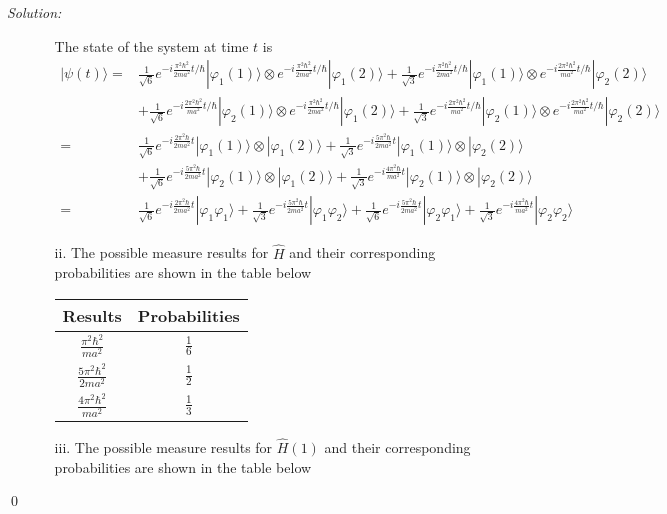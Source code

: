 \documentclass[12pt,a4paper]{article}
\newenvironment{sol}
    {\emph{Solution:}
    }
    {
    \qed
    }
\begin{document}
\begin{sol}
\begin{itemize}
\begin{itemize}
The state of the system at time $t$ is
\small\begin{align}
\nonumber|\psi(t)\rangle=&\frac{1}{\sqrt{6}}e^{-i\frac{\pi^2\hbar^2}{2ma^2}t/\hbar}|\varphi_1(1)\rangle\otimes e^{-i\frac{\pi^2\hbar^2}{2ma^2}t/\hbar}|\varphi_1(2)\rangle+\frac{1}{\sqrt{3}}e^{-i\frac{\pi^2\hbar^2}{2ma^2}t/\hbar}|\varphi_1(1)\rangle\otimes e^{-i\frac{2\pi^2\hbar^2}{ma^2}t/\hbar}|\varphi_2(2)\rangle\\
\nonumber&+\frac{1}{\sqrt{6}}e^{-i\frac{2\pi^2\hbar^2}{ma^2}t/\hbar}|\varphi_2(1)\rangle\otimes e^{-i\frac{\pi^2\hbar^2}{2ma^2}t/\hbar}|\varphi_1(2)\rangle+\frac{1}{\sqrt{3}}e^{-i\frac{2\pi^2\hbar^2}{ma^2}t/\hbar}|\varphi_2(1)\rangle\otimes e^{-i\frac{2\pi^2\hbar^2}{ma^2}t/\hbar}|\varphi_2(2)\rangle\\
\nonumber=&\frac{1}{\sqrt{6}}e^{-i\frac{2\pi^2\hbar}{2ma^2}t}|\varphi_1(1)\rangle\otimes|\varphi_1(2)\rangle+\frac{1}{\sqrt{3}}e^{-i\frac{5\pi^2\hbar}{2ma^2}t}|\varphi_1(1)\rangle\otimes|\varphi_2(2)\rangle\\
\nonumber&+\frac{1}{\sqrt{6}}e^{-i\frac{5\pi^2\hbar}{2ma^2}t}|\varphi_2(1)\rangle\otimes|\varphi_1(2)\rangle+\frac{1}{\sqrt{3}}e^{-i\frac{4\pi^2\hbar}{ma^2}t}|\varphi_2(1)\rangle\otimes|\varphi_2(2)\rangle\\
=&\frac{1}{\sqrt{6}}e^{-i\frac{2\pi^2\hbar}{2ma^2}t}|\varphi_1\varphi_1\rangle+\frac{1}{\sqrt{3}}e^{-i\frac{5\pi^2\hbar}{2ma^2}t}|\varphi_1\varphi_2\rangle+\frac{1}{\sqrt{6}}e^{-i\frac{5\pi^2\hbar}{2ma^2}t}|\varphi_2\varphi_1\rangle+\frac{1}{\sqrt{3}}e^{-i\frac{4\pi^2\hbar}{ma^2}t}|\varphi_2\varphi_2\rangle
\end{align}\normalsize
\item[ii.] The possible measure results for $\hat{H}$ and their corresponding probabilities are shown in the table below
\begin{table}[h]
\centering
\begin{tabular}{|c|c|}
\hline
Results                       & Probabilities \\ \hline
$\frac{\pi^2\hbar^2}{ma^2}$   & $\frac{1}{6}$ \\ \hline
$\frac{5\pi^2\hbar^2}{2ma^2}$ & $\frac{1}{2}$ \\ \hline
$\frac{4\pi^2\hbar^2}{ma^2}$  & $\frac{1}{3}$ \\ \hline
\end{tabular}
\end{table}
\item[iii.] The possible measure results for $\hat{H}(1)$ and their corresponding probabilities are shown in the table below

\end{itemize}
\end{itemize}
\end{sol}
\end{document}
